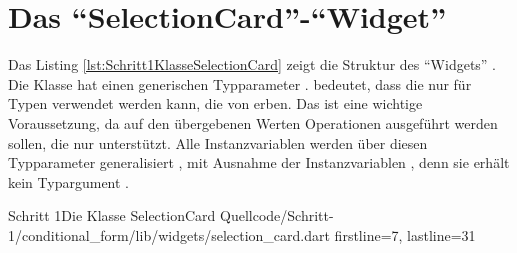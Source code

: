 

\section{Das \enquote{SelectionCard}-\enquote{Widget}}

Das Listing \ref{lst:Schritt1KlasseSelectionCard} zeigt die Struktur des \enquote{Widgets} .
Die Klasse hat einen generischen Typparameter .
 bedeutet, dass die  nur für Typen verwendet werden kann, die von  erben.
Das ist eine wichtige Voraussetzung, da auf den übergebenen Werten Operationen ausgeführt werden sollen, die nur  unterstützt.
Alle Instanzvariablen werden über diesen Typparameter generalisiert , mit Ausnahme der Instanzvariablen , denn sie erhält kein Typargument .

\begin{alexlisting}{Schritt 1}{Die Klasse SelectionCard}
  {Quellcode/Schritt-1/conditional_form/lib/widgets/selection_card.dart}
  {firstline=7, lastline=31}
  \label{lst:Schritt1KlasseSelectionCard}
\end{alexlisting}

